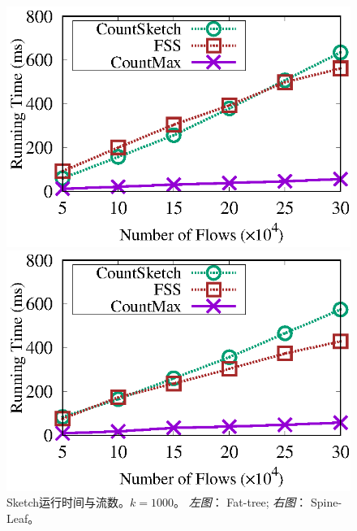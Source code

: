 \begin{figure}[!t]
	\centering
	\begin{minipage}[t]{0.49\linewidth}
		\centering
		\includegraphics[width=\linewidth]{fig/ft_flow_time_1000.eps}
	\end{minipage}\vspace{-0.6em}%
	\begin{minipage}[t]{0.49\linewidth}
		\centering
		\includegraphics[width=\linewidth]{fig/hy_flow_time_1000.eps}
	\end{minipage} \vspace{-0.6em}%
	\caption{\textnormal{Sketch运行时间与流数。$k=1000$。 \textit{左图}： Fat-tree; \textit{右图}： Spine-Leaf。}}
	\label{fig:time,f}
\end{figure}

